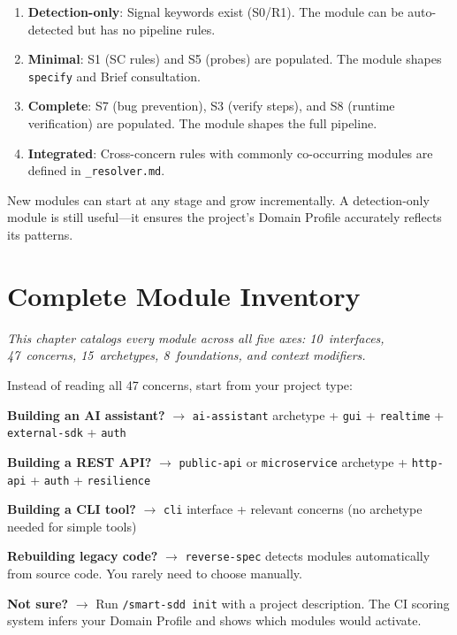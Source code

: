 \documentclass[11pt,a4paper,openright,twoside]{report}
\newcommand{\file}[1]{\texttt{#1}}
\begin{document}
\begin{enumerate}
  \item \textbf{Detection-only}: Signal keywords exist (S0/R1). The module can be auto-detected but has no pipeline rules.
  \item \textbf{Minimal}: S1 (SC rules) and S5 (probes) are populated. The module shapes \texttt{specify} and Brief consultation.
  \item \textbf{Complete}: S7 (bug prevention), S3 (verify steps), and S8 (runtime verification) are populated. The module shapes the full pipeline.
  \item \textbf{Integrated}: Cross-concern rules with commonly co-occurring modules are defined in \file{\_resolver.md}.
\end{enumerate}

New modules can start at any stage and grow incrementally. A detection-only module is still useful---it ensures the project's Domain Profile accurately reflects its patterns.


\chapter{Complete Module Inventory}
\label{ch:inventory}

\textit{This chapter catalogs every module across all five axes: 10~interfaces, 47~concerns, 15~archetypes, 8~foundations, and context modifiers.}

\begin{tipbox}
Instead of reading all 47 concerns, start from your project type:

\textbf{Building an AI assistant?} $\rightarrow$ \texttt{ai-assistant} archetype + \texttt{gui} + \texttt{realtime} + \texttt{external-sdk} + \texttt{auth}

\textbf{Building a REST API?} $\rightarrow$ \texttt{public-api} or \texttt{microservice} archetype + \texttt{http-api} + \texttt{auth} + \texttt{resilience}

\textbf{Building a CLI tool?} $\rightarrow$ \texttt{cli} interface + relevant concerns (no archetype needed for simple tools)

\textbf{Rebuilding legacy code?} $\rightarrow$ \texttt{reverse-spec} detects modules automatically from source code. You rarely need to choose manually.

\textbf{Not sure?} $\rightarrow$ Run \texttt{/smart-sdd init} with a project description. The CI scoring system infers your Domain Profile and shows which modules would activate.
\end{tipbox}
\end{document}
